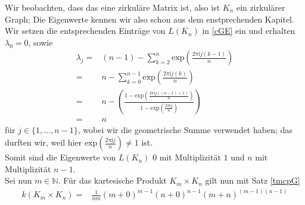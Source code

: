 Wir beobachten, dass das eine zirkuläre Matrix ist, also ist $K_n$ ein zirkulärer Graph;
Die Eigenwerte kennen wir also schon aus dem enstprechenden Kapitel. Wir setzen die entsprechenden Einträge von $L(K_n)$ in \ref{cGE} ein und erhalten $\lambda_0=0$, sowie
\begin{equation}
\begin{split}
 \lambda_j = {} & (n-1) - \sum_{k=2}^{n}\mathrm{exp}{\left(\frac{2\pi \mathrm{i}j(k-1)}{n}\right)}\\
 ={} & n - \sum_{k=0}^{n-1}\mathrm{exp}{\left(\frac{2\pi \mathrm{i}j(k)}{n}\right)}\\
 ={} & n - \left( \frac{1-\mathrm{exp}{\left(\frac{2\pi \mathrm{i}j((n-1)+1)}{n}\right)}}{1-\mathrm{exp}{\left(\frac{2\pi \mathrm{i}j}{n}\right)}} \right)\\
 ={}&n
 \end{split}
\end{equation}
für $j\in\{1,\ldots,n-1\}$, wobei wir die geometrische Summe verwendet haben; das durften wir, weil hier $\mathrm{exp}{\left(\frac{2\pi \mathrm{i}j}{n}\right)} \neq 1$ ist.\\
Somit sind die Eigenwerte von $L(K_n)$ $0$ mit Multiplizität $1$ und $n$ mit Multiplizität $n-1$.\\
Sei nun $m\in\mathbb{N}$.
Für das kartesische Produkt $K_m\times K_n$ gilt nun mit Satz \ref{tmcpG}
\begin{equation}
 \begin{split}
  \mathit{k}(K_m\times K_n)={}&\frac{1}{nm}(m+0)^{m-1}(n+0)^{n-1}(m+n)^{(m-1)(n-1)}
 \end{split}
\end{equation}


